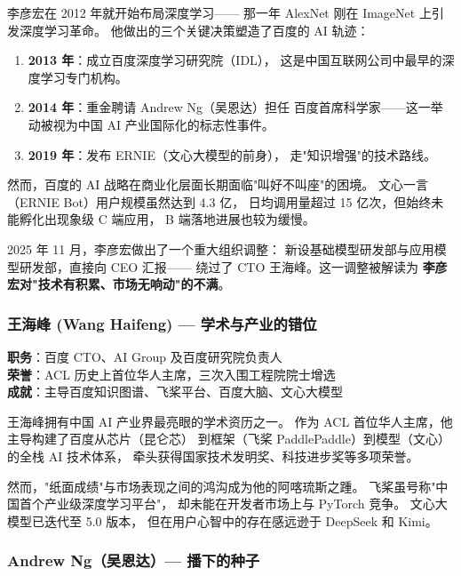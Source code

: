 李彦宏在 2012 年就开始布局深度学习——
那一年 AlexNet 刚在 ImageNet 上引发深度学习革命。
他做出的三个关键决策塑造了百度的 AI 轨迹：

\begin{enumerate}[noitemsep]
  \item \textbf{2013 年}：成立百度深度学习研究院（IDL），
        这是中国互联网公司中最早的深度学习专门机构。
  \item \textbf{2014 年}：重金聘请 Andrew Ng（吴恩达）担任
        百度首席科学家——这一举动被视为中国 AI 产业国际化的标志性事件。
  \item \textbf{2019 年}：发布 ERNIE（文心大模型的前身），
        走"知识增强"的技术路线。
\end{enumerate}

然而，百度的 AI 战略在商业化层面长期面临"叫好不叫座"的困境。
文心一言（ERNIE Bot）用户规模虽然达到 4.3 亿，
日均调用量超过 15 亿次，但始终未能孵化出现象级 C 端应用，
B 端落地进展也较为缓慢。

2025 年 11 月，李彦宏做出了一个重大组织调整：
新设基础模型研发部与应用模型研发部，直接向 CEO 汇报——
绕过了 CTO 王海峰。这一调整被解读为
\textbf{李彦宏对"技术有积累、市场无响动"的不满}。

\subsubsection{王海峰 (Wang Haifeng) — 学术与产业的错位}

\begin{keybox}
\textbf{职务}：百度 CTO、AI Group 及百度研究院负责人 \\
\textbf{荣誉}：ACL 历史上首位华人主席，三次入围工程院院士增选 \\
\textbf{成就}：主导百度知识图谱、飞桨平台、百度大脑、文心大模型
\end{keybox}

王海峰拥有中国 AI 产业界最亮眼的学术资历之一。
作为 ACL 首位华人主席，他主导构建了百度从芯片（昆仑芯）
到框架（飞桨 PaddlePaddle）到模型（文心）的全栈 AI 技术体系，
牵头获得国家技术发明奖、科技进步奖等多项荣誉。

然而，"纸面成绩"与市场表现之间的鸿沟成为他的阿喀琉斯之踵。
飞桨虽号称"中国首个产业级深度学习平台"，
却未能在开发者市场上与 PyTorch 竞争。
文心大模型已迭代至 5.0 版本，
但在用户心智中的存在感远逊于 DeepSeek 和 Kimi。

\subsubsection{Andrew Ng（吴恩达）— 播下的种子}

